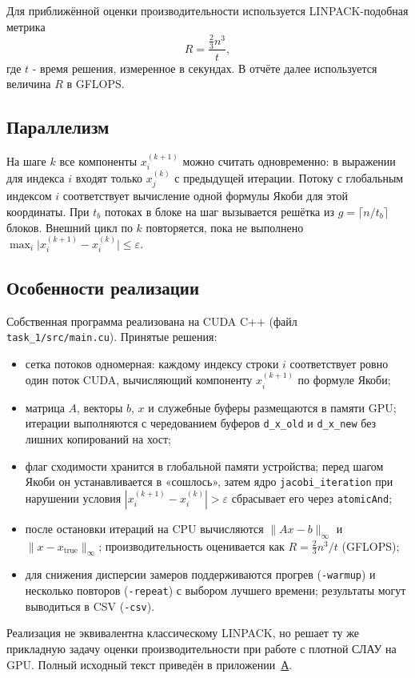 \documentclass[areasetadvanced]{scrartcl}
\newcommand{\appref}[2]{\hyperref[#1]{#2}}
\begin{document}
Для приближённой оценки производительности используется LINPACK-подобная метрика
\begin{equation}
    R = \frac{\frac{2}{3} n^3}{t},
\end{equation}
где $t$ - время решения, измеренное в секундах. В отчёте далее используется величина $R$ в GFLOPS.

\subsection{Параллелизм}

На шаге $k$ все компоненты $x_i^{(k+1)}$ можно считать одновременно: 
в выражении для индекса $i$ входят только $x_j^{(k)}$ с предыдущей 
итерации. Потоку с глобальным индексом $i$ соответствует вычисление одной формулы Якоби для этой координаты.
 При $t_b$ потоках в блоке на шаг вызывается решётка из $g = \lceil n / t_b \rceil$ блоков.
  Внешний цикл по $k$ повторяется, пока не выполнено $\max_i \bigl| x_i^{(k+1)} - x_i^{(k)} \bigr| \le \varepsilon$.

\subsection{Особенности реализации}

Собственная программа реализована на CUDA C++ (файл \texttt{task\_1/src/main.cu}). Принятые решения:
\begin{itemize}
  \item сетка потоков одномерная: каждому индексу строки $i$ соответствует ровно один поток CUDA, вычисляющий компоненту $x_i^{(k+1)}$ по формуле Якоби;
  \item матрица $A$, векторы $b$, $x$ и служебные буферы размещаются в памяти GPU; итерации выполняются с чередованием буферов \texttt{d\_x\_old} и \texttt{d\_x\_new} без лишних копирований на хост;
  \item флаг сходимости хранится в глобальной памяти устройства; перед шагом Якоби он устанавливается в «сошлось», затем ядро \texttt{jacobi\_iteration} при нарушении условия $|x_i^{(k+1)}-x_i^{(k)}|>\varepsilon$ сбрасывает его через \texttt{atomicAnd};
  \item после остановки итераций на CPU вычисляются $\|Ax-b\|_\infty$ и $\|x-x_{\mathrm{true}}\|_\infty$; производительность оценивается как $R=\frac{2}{3}n^3/t$ (GFLOPS);
  \item для снижения дисперсии замеров поддерживаются прогрев (\texttt{-warmup}) и несколько повторов (\texttt{-repeat}) с выбором лучшего времени; результаты могут выводиться в CSV (\texttt{-csv}).
\end{itemize}
Реализация не эквивалентна классическому LINPACK, но решает ту же прикладную задачу оценки производительности при работе с плотной СЛАУ на GPU. Полный исходный текст приведён в приложении~\appref{app:t1-main}{А}.
\end{document}
